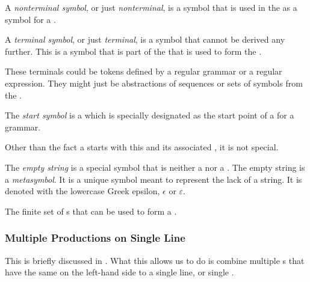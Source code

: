 \begin{definition}\label{def:Nonterminal_Symbol}
  A \emph{nonterminal symbol}, or just \emph{nonterminal}, is a symbol that is used in the  as a symbol for a .
\end{definition}

\begin{definition}\label{def:Terminal_Symbol}
  A \emph{terminal symbol}, or just \emph{terminal}, is a symbol that cannot be derived any further.
  This is a symbol that is part of the  that is used to form the .

  \begin{remark}
    These terminals could be tokens defined by a regular grammar or a regular expression.
    They might just be abstractions of sequences or sets of symbols from the .
  \end{remark}
\end{definition}

\begin{definition}\label{def:Start_Symbol}
  The \emph{start symbol} is a  which is specially designated as the start point of a  for a grammar.

  Other than the fact a  starts with this  and its associated , it is not special.
\end{definition}

\begin{definition}\label{def:Empty_String}
  The \emph{empty string} is a special symbol that is neither a  nor a .
  The empty string is a \emph{metasymbol}.
  It is a unique symbol meant to represent the lack of a string.
  It is denoted with the lowercase Greek epsilon, $\epsilon$ or $\varepsilon$.
\end{definition}

\begin{definition}[Alphabet]\label{def:Alphabet}
  The finite set of s that can be used to form a .
\end{definition}

\subsubsection{Multiple Productions on Single Line}\label{subsubsec:Multiple_Productions_One_Line}
This is briefly discussed in .
What this allows us to do is combine multiple s that have the same  on the left-hand side to a single line, or single .

